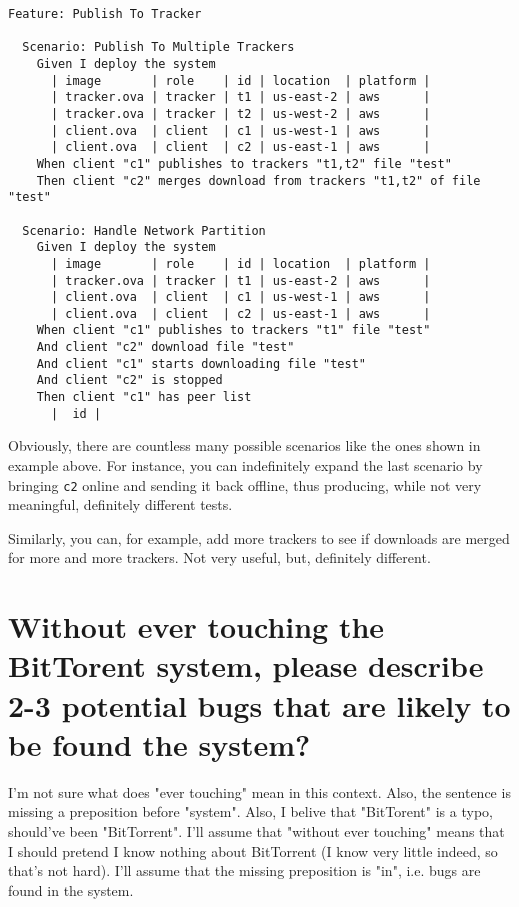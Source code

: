 \documentclass[11pt]{article}
\begin{document}
\begin{verbatim}
Feature: Publish To Tracker

  Scenario: Publish To Multiple Trackers
    Given I deploy the system
      | image       | role    | id | location  | platform |
      | tracker.ova | tracker | t1 | us-east-2 | aws      |
      | tracker.ova | tracker | t2 | us-west-2 | aws      |
      | client.ova  | client  | c1 | us-west-1 | aws      |
      | client.ova  | client  | c2 | us-east-1 | aws      |
    When client "c1" publishes to trackers "t1,t2" file "test"
    Then client "c2" merges download from trackers "t1,t2" of file "test"

  Scenario: Handle Network Partition
    Given I deploy the system
      | image       | role    | id | location  | platform |
      | tracker.ova | tracker | t1 | us-east-2 | aws      |
      | client.ova  | client  | c1 | us-west-1 | aws      |
      | client.ova  | client  | c2 | us-east-1 | aws      |
    When client "c1" publishes to trackers "t1" file "test"
    And client "c2" download file "test"
    And client "c1" starts downloading file "test"
    And client "c2" is stopped
    Then client "c1" has peer list
      |  id |
\end{verbatim}

Obviously, there are countless many possible scenarios like the
ones shown in example above.  For instance, you can indefinitely
expand the last scenario by bringing \texttt{c2} online and sending it
back offline, thus producing, while not very meaningful,
definitely different tests.

Similarly, you can, for example, add more trackers to see if
downloads are merged for more and more trackers.  Not very useful,
but, definitely different.

\section{Without ever touching the BitTorent system, please describe 2-3 potential bugs that are likely to be found the system?}
\label{sec:org300f17e}
I'm not sure what does "ever touching" mean in this context.  Also,
the sentence is missing a preposition before "system".  Also, I
belive that "BitTorent" is a typo, should've been "BitTorrent".
I'll assume that "without ever touching" means that I should pretend
I know nothing about BitTorrent (I know very little indeed, so
that's not hard).  I'll assume that the missing preposition is "in",
i.e. bugs are found in the system.
\end{document}

